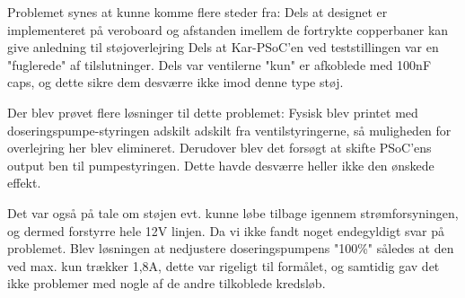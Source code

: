 Problemet synes at kunne komme flere steder fra: 
Dels at designet er implementeret på veroboard og afstanden imellem de fortrykte copperbaner kan give anledning til støjoverlejring
Dels at Kar-PSoC'en ved teststillingen var en "fuglerede" af tilslutninger. 
Dels var ventilerne "kun" er afkoblede med 100nF caps, og dette sikre dem desværre ikke imod denne type støj.\newline

Der blev prøvet flere løsninger til dette problemet: 
Fysisk blev printet med doseringspumpe-styringen adskilt adskilt fra ventilstyringerne, så muligheden for overlejring her blev elimineret. 
Derudover blev det forsøgt at skifte PSoC'ens output ben til pumpestyringen. Dette havde desværre heller ikke den ønskede effekt. \newline

Det var også på tale om støjen evt. kunne løbe tilbage igennem strømforsyningen, og dermed forstyrre hele 12V linjen. 
Da vi ikke fandt noget endegyldigt svar på problemet. Blev løsningen at nedjustere doseringspumpens "100\%" således at den ved max. kun trækker 1,8A, dette var rigeligt til formålet, og samtidig gav det ikke problemer med nogle af de andre tilkoblede kredsløb.
\newline